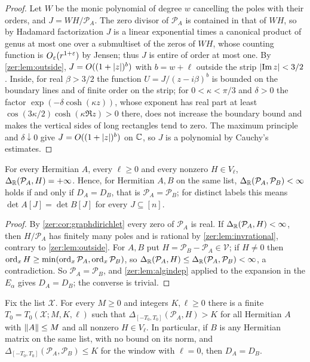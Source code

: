 \begin{proof}
Let $W$ be the monic polynomial of degree $w$ cancelling the poles with their orders, and $J=WH/\mathcal P_A$.
The zero divisor of $\mathcal P_A$ is contained in that of $WH$, so by Hadamard factorization
\cite{Boas1954Entire} $J$ is a linear exponential times a canonical product of genus at most one over a
submultiset of the zeros of $WH$, whose counting function is $O_\varepsilon(r^{1+\varepsilon})$ by Jensen; thus $J$ is
entire of order at most one. By \cref{zer:lem:outside}, $J=O((1+\lvert z\rvert)^{b})$ with $b=w+\ell$ outside the
strip $\lvert\operatorname{Im} z\rvert<3/2$. Inside, for real $\beta>3/2$ the function $U=J/(z-i\beta)^{b}$ is bounded on the
boundary lines and of finite order on the strip; for $0<\kappa<\pi/3$ and $\delta>0$ the factor
$\exp(-\delta\cosh(\kappa z))$, whose exponent has real part at least $\cos(3\kappa/2)\cosh(\kappa\Re z)>0$
there, does not increase the boundary bound and makes the vertical sides of long rectangles tend to zero.
The maximum principle and $\delta\downarrow0$ give $J=O((1+\lvert z\rvert)^{b})$ on $\mathbb{C}$, so $J$ is a polynomial by
Cauchy's estimates.
\end{proof}

\begin{theorem}\label{zer:thm:tailrigid}
For every Hermitian $A$, every $\ell\ge0$ and every nonzero $H\in V_\ell$, $\Delta_{\mathbb{R}}(\mathcal P_A,H)=+\infty$.
Hence, for Hermitian $A,B$ on the same list, $\Delta_{\mathbb{R}}(\mathcal P_A,\mathcal P_B)<\infty$ holds if and only
if $D_A=D_B$, that is $\mathcal P_A=\mathcal P_B$; for distinct labels this means
$\det A[J]=\det B[J]$ for every $J\subseteq[n]$.
\end{theorem}

\begin{proof}
By \cref{zer:cor:graphdirichlet} every zero of $\mathcal P_A$ is real. If $\Delta_{\mathbb{R}}(\mathcal P_A,H)<\infty$,
then $H/\mathcal P_A$ has finitely many poles and is rational by \cref{zer:lem:invrational}, contrary to
\cref{zer:lem:outside}. For $A,B$ put $H=\mathcal P_B-\mathcal P_A\in\mathcal V$; if $H\ne0$ then
$\operatorname{ord}_xH\ge\min(\operatorname{ord}_x\mathcal P_A,\operatorname{ord}_x\mathcal P_B)$, so $\Delta_{\mathbb{R}}(\mathcal P_A,H)\le\Delta_{\mathbb{R}}(\mathcal P_A,\mathcal P_B)<\infty$,
a contradiction. So $\mathcal P_A=\mathcal P_B$, and \cref{zer:lem:algindep} applied to the expansion in the
$E_\alpha$ gives $D_A=D_B$; the converse is trivial.
\end{proof}

\begin{theorem}\label{zer:thm:window}
Fix the list $\mathcal X$. For every $M\ge0$ and integers $K,\ell\ge0$ there is a finite
$T_0=T_0(\mathcal X;M,K,\ell)$ such that $\Delta_{[-T_0,T_0]}(\mathcal P_A,H)>K$ for all Hermitian $A$ with
$\lVert A\rVert\le M$ and all nonzero $H\in V_\ell$. In particular, if $B$ is any Hermitian matrix on the same
list, with no bound on its norm, and $\Delta_{[-T_0,T_0]}(\mathcal P_A,\mathcal P_B)\le K$ for the window with
$\ell=0$, then $D_A=D_B$.
\end{theorem}

